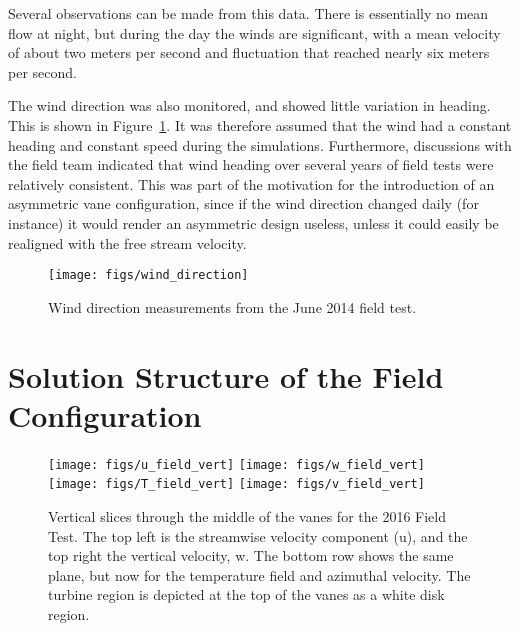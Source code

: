 Several observations can be made from this data. There is essentially no
mean flow at night, but during the day the winds are significant,
with a mean velocity of about two meters per second and fluctuation that
reached nearly six meters per second. 

The wind direction was also monitored, and showed little variation in heading. 
This is shown in Figure~\ref{fig:wind_direction}. It was therefore
assumed that the wind had a constant heading and constant speed during
the simulations. Furthermore, discussions with the field team indicated
that wind heading over several years of field tests were relatively
consistent. This was part of the motivation for the introduction of an
asymmetric vane configuration, since if the wind direction changed daily
(for instance) it would render an asymmetric design useless, unless it
could easily be realigned with the free stream velocity. 

 \begin{figure}[!htb]
  \begin{center}
   \texttt{[image: figs/wind\_direction]}
   \caption{Wind direction measurements from the June 2014 field test.}
   \label{fig:wind_direction}
  \end{center}
 \end{figure}



\section{Solution Structure of the Field Configuration}
\label{subsec:field_predict}

\begin{figure}[!htb]
  \centering
  \texttt{[image: figs/u\_field\_vert]}
  \hfill
  \texttt{[image: figs/w\_field\_vert]}
  \\
  \texttt{[image: figs/T\_field\_vert]}
  \hfill
  \texttt{[image: figs/v\_field\_vert]}
 \caption{Vertical slices through the middle of the vanes for the
 2016 Field Test. The top left is the streamwise velocity component
 (u), and the top right the vertical velocity, w. The bottom row shows
 the same plane, but now for the temperature field and azimuthal
 velocity. The turbine region is depicted at the top of the vanes as a
 white disk region.} 
  \label{fig:field_vert}
\end{figure}


